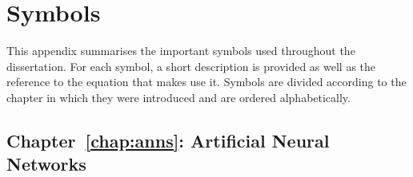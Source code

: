 \chapter{Symbols}
\label{app:symbols}

This appendix summarises the important symbols used throughout the dissertation. For each symbol, a short description is provided as well as the reference to the equation that makes use it. Symbols are divided according to the chapter in which they were introduced and are ordered alphabetically.

\section{Chapter~\ref{chap:anns}: Artificial Neural Networks}
\label{sec:symbols:anns}

\begin{description}


\end{description}
